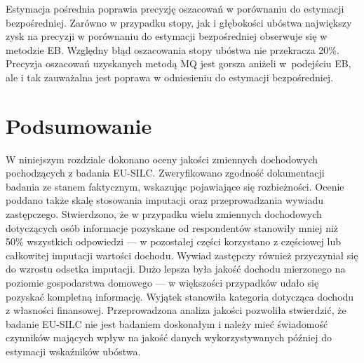 Estymacja pośrednia poprawia precyzję oszacowań w porównaniu do estymacji bezpośredniej. Zarówno w przypadku stopy, jak i głębokości ubóstwa największy zysk na precyzji w porównaniu do estymacji bezpośredniej obserwuje się w metodzie EB. Względny błąd oszacowania stopy ubóstwa nie przekracza 20\%. Precyzja oszacowań uzyskanych metodą MQ jest gorsza aniżeli w~podejściu EB, ale i tak zauważalna jest poprawa w odniesieniu do estymacji bezpośredniej.

\section{Podsumowanie}

W niniejszym rozdziale dokonano oceny jakości zmiennych dochodowych pochodzących z badania EU-SILC. Zweryfikowano zgodność dokumentacji badania ze stanem faktycznym, wskazując pojawiające się rozbieżności. Ocenie poddano także skalę stosowania imputacji oraz przeprowadzania wywiadu zastępczego. Stwierdzono, że w przypadku wielu zmiennych dochodowych dotyczących osób informacje pozyskane od respondentów stanowiły mniej niż 50\% wszystkich odpowiedzi --- w pozostałej części korzystano z częściowej lub całkowitej imputacji wartości dochodu. Wywiad zastępczy również przyczyniał się do wzrostu odsetka imputacji. Dużo lepsza była jakość dochodu mierzonego na poziomie gospodarstwa domowego --- w większości przypadków udało się pozyskać kompletną informację. Wyjątek stanowiła kategoria dotycząca dochodu z własności finansowej. Przeprowadzona analiza jakości pozwoliła stwierdzić, że badanie EU-SILC nie jest badaniem doskonałym i należy mieć świadomość czynników mających wpływ na jakość danych wykorzystywanych później do estymacji wskaźników ubóstwa.


